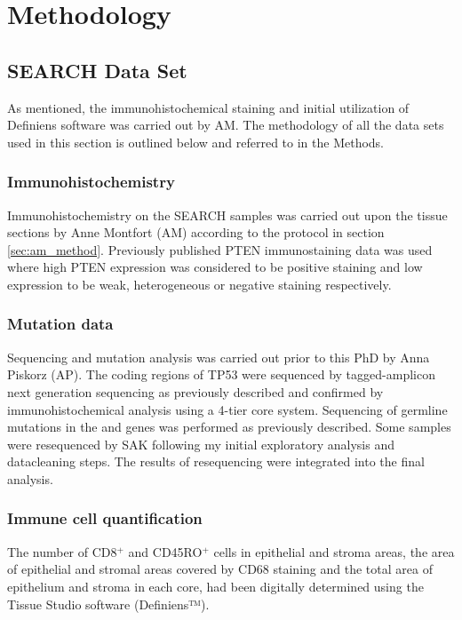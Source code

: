 \section[Methods]{Methodology}
\subsection{SEARCH Data Set}
As mentioned, the immunohistochemical staining and initial utilization of Definiens software was carried out by AM. The methodology of all the data sets used in this section is outlined below and referred to in the Methods. 
\subsubsection{Immunohistochemistry}
Immunohistochemistry on the SEARCH samples was carried out upon the tissue sections by Anne Montfort (AM) according to the protocol in section \ref{sec:am_method}. Previously published PTEN immunostaining data was used where high PTEN expression was considered to be positive staining and low expression to be weak, heterogeneous or negative staining respectively\cite{RN17}.

\subsubsection{Mutation data}

Sequencing and mutation analysis was carried out prior to this PhD by Anna Piskorz (AP). The coding regions of TP53 were sequenced by tagged-amplicon next generation sequencing as previously described\cite{RN18} and confirmed by immunohistochemical analysis using a 4-tier core system\cite{RN19}. Sequencing of germline mutations in the   and  genes was performed as previously described\cite{RN20}. Some samples were resequenced by SAK following my initial exploratory analysis and datacleaning steps. The results of resequencing were integrated into the final analysis.

\subsubsection{Immune cell quantification}
 The number of CD8$^+$ and CD45RO$^+$ cells in epithelial and stroma areas, the area of epithelial and stromal areas covered by CD68 staining and the total area of epithelium and stroma in each core, had been digitally determined using the Tissue Studio software (Definiens™).

